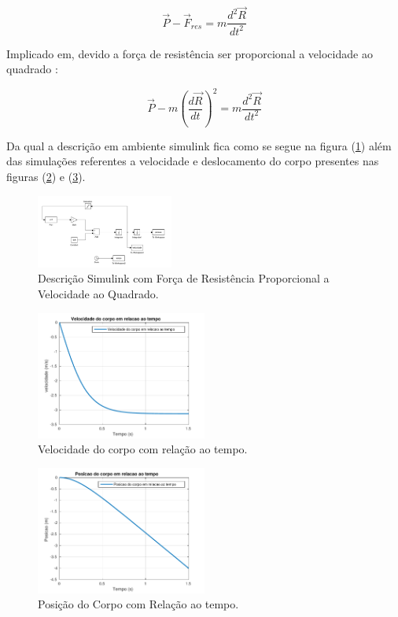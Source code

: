 \documentclass[DIV=calc, paper=a4, fontsize=11pt, twocolumn]{scrartcl}	 %
\begin{document}
\begin{equation}
 \vec{P}-\vec{F}_{res}=m\frac{d^2\vec{R}}{dt^2}
\end{equation}

Implicado em, devido a força de resistência ser proporcional a velocidade ao quadrado :

\begin{equation}
 \vec{P}-m({\frac{d\vec{R}}{dt}})^2=m\frac{d^2\vec{R}}{dt^2}
\end{equation}

Da qual a descrição em ambiente simulink fica como se segue na figura (\ref{fig:blocos_ao_quadrado}) além das simulações referentes a velocidade e deslocamento do corpo presentes nas
figuras (\ref{fig:velocidade_quadrado}) e (\ref{fig:posicao_do_corpo_ao_quadrado}).

\begin{figure}[h!]
\centering
\includegraphics[width=0.4\textwidth]{blocos_ao_quadrado}
\caption{Descrição Simulink com Força de Resistência Proporcional a Velocidade ao Quadrado.}
\label{fig:blocos_ao_quadrado}
\end{figure}

\begin{figure}[h!]
\centering
\includegraphics[width=0.5\textwidth]{velocidade_quadrado}
\caption{Velocidade do corpo com relação ao tempo.}
\label{fig:velocidade_quadrado}
\end{figure}

\newpage

\begin{figure}[h!]
\centering
\includegraphics[width=0.5\textwidth]{posicao_do_corpo_ao_quadrado}
\caption{Posição do Corpo com Relação ao tempo.}
\label{fig:posicao_do_corpo_ao_quadrado}
\end{figure}
\end{document}

